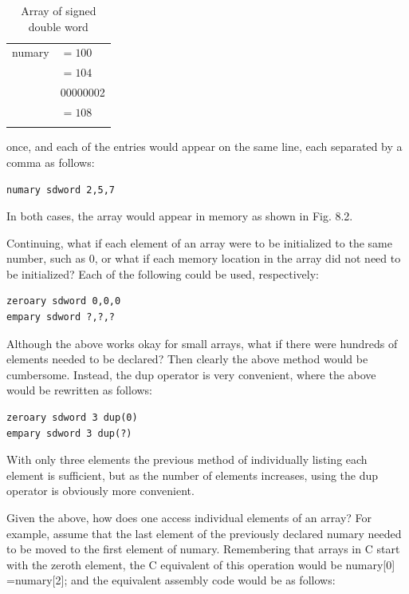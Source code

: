 \documentclass[10pt]{book}
\begin{document}
\begin{table}[h]
\centering
\begin{tabular}{ll}
\hline
numary & $=100$ \\
 & $=104$ \\
 & 00000002 \\
 & $=108$ \\
 &  \\
\hline
\end{tabular}
\caption{Array of signed double word}
\end{table}

once, and each of the entries would appear on the same line, each separated by a comma as follows:
\begin{verbatim}
numary sdword 2,5,7
\end{verbatim}

In both cases, the array would appear in memory as shown in Fig. 8.2.

Continuing, what if each element of an array were to be initialized to the same number, such as 0, or what if each memory location in the array did not need to be initialized? Each of the following could be used, respectively:

\begin{verbatim}
zeroary sdword 0,0,0
empary sdword ?,?,?
\end{verbatim}

Although the above works okay for small arrays, what if there were hundreds of elements needed to be declared? Then clearly the above method would be cumbersome. Instead, the dup operator is very convenient, where the above would be rewritten as follows:

\begin{verbatim}
zeroary sdword 3 dup(0)
empary sdword 3 dup(?)
\end{verbatim}

With only three elements the previous method of individually listing each element is sufficient, but as the number of elements increases, using the dup operator is obviously more convenient.

Given the above, how does one access individual elements of an array? For example, assume that the last element of the previously declared numary needed to be moved to the first element of numary. Remembering that arrays in C start with the zeroth element, the C equivalent of this operation would be numary[0] =numary[2]; and the equivalent assembly code would be as follows:
\end{document}
